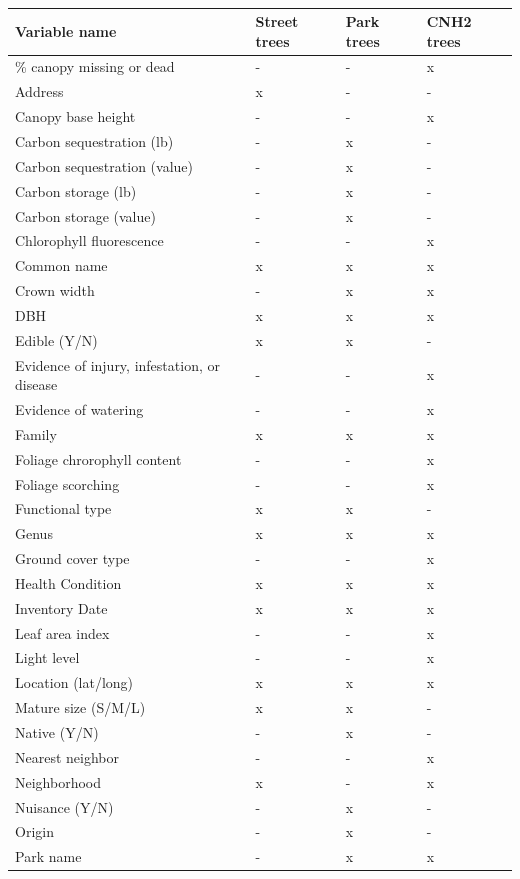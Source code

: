 \documentclass[12pt,twoside]{reedthesis}
\begin{document}
\begin{longtable}[t]{llll}
\caption{\label{tab:var-type-table}}\\
\toprule
Variable name & Street trees & Park trees & CNH2 trees\\
\midrule
\% canopy missing or dead & - & - & x\\
Address & x & - & -\\
Canopy base height & - & - & x\\
Carbon sequestration (lb) & - & x & -\\
Carbon sequestration (value) & - & x & -\\
\addlinespace
Carbon storage (lb) & - & x & -\\
Carbon storage (value) & - & x & -\\
Chlorophyll fluorescence & - & - & x\\
Common name & x & x & x\\
Crown width & - & x & x\\
\addlinespace
DBH & x & x & x\\
Edible (Y/N) & x & x & -\\
Evidence of injury, infestation, or disease & - & - & x\\
Evidence of watering & - & - & x\\
Family & x & x & x\\
\addlinespace
Foliage chrorophyll content & - & - & x\\
Foliage scorching & - & - & x\\
Functional type & x & x & -\\
Genus & x & x & x\\
Ground cover type & - & - & x\\
\addlinespace
Health Condition & x & x & x\\
Inventory Date & x & x & x\\
Leaf area index & - & - & x\\
Light level & - & - & x\\
Location (lat/long) & x & x & x\\
\addlinespace
Mature size (S/M/L) & x & x & -\\
Native (Y/N) & - & x & -\\
Nearest neighbor & - & - & x\\
Neighborhood & x & - & x\\
Nuisance (Y/N) & - & x & -\\
\addlinespace
Origin & - & x & -\\
Park name & - & x & x\\

\end{longtable}
\end{document}
